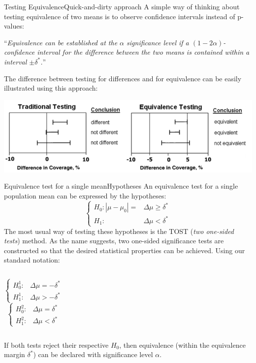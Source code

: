 \begin{frame}{Testing Equivalence}{Quick-and-dirty approach}
A simple way of thinking about testing equivalence of two means is to observe confidence intervals instead of p-values:

\begin{exampleblock}{}
\centering ``\textit{Equivalence can be established at the $\alpha$ significance level if a $(1-2\alpha)$-confidence interval for the difference between the two means is contained within a interval $\pm\delta^*$.}''
\end{exampleblock}

The difference between testing for differences and for equivalence can be easily illustrated using this approach:

\centering\includegraphics[width=.8\textwidth]{../img/DiffVxEquiv.png}
\end{frame}

\begin{frame}{Equivalence test for a single mean}{Hypotheses}
An equivalence test for a single population mean can be expressed by the hypotheses:
\begin{equation*}
  \begin{cases}
  H_0: \left|\mu-\mu_0\right| = &\Delta\mu \geq\delta^*\\
  H_1: &\Delta\mu <\delta^*
  \end{cases}
\end{equation*}
\medskip
The most usual way of testing these hypotheses is the TOST (\textit{two one-sided tests}) method. As the name suggests, two one-sided significance tests are constructed so that the desired statistical properties can be achieved. Using our standard notation:
\begin{columns}[T]
\begin{equation*}
\begin{cases}
H_0^1: &\Delta\mu = -\delta^*\\
H_1^1: &\Delta\mu > -\delta^*
\end{cases}
\end{equation*}
\begin{equation*}
\begin{cases}
H_0^2: &\Delta\mu = \delta^*\\
H_1^2: &\Delta\mu < \delta^*
\end{cases}
\end{equation*}
\end{columns}
\bigskip
If both tests reject their respective $H_0$, then equivalence (within the equivalence margin $\delta^*$) can be declared with significance level $\alpha$.
\end{frame}

